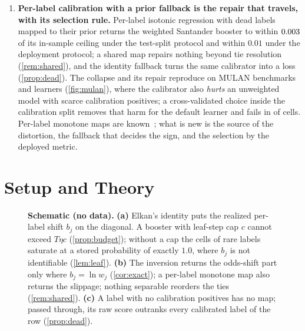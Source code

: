 \documentclass[sigconf,nonacm]{acmart}
\begin{document}
\begin{enumerate}[leftmargin=*,nosep]
\item \textbf{Per-label calibration with a prior fallback is the repair that travels, with its selection rule.} Per-label isotonic regression with dead labels mapped to their prior returns the weighted Santander booster to within $0.003$ of its in-sample ceiling under the test-split protocol and within $0.01$ under the deployment protocol; a shared map repairs nothing beyond tie resolution (\cref{rem:shared}), and the identity fallback turns the same calibrator into a loss (\cref{prop:dead}). The collapse and its repair reproduce on \nnMulan{} MULAN benchmarks and \nnLearners{} learners (\cref{fig:mulan}), where the calibrator also \emph{hurts} an unweighted model with scarce calibration positives; a cross-validated choice inside the calibration split removes that harm for the default learner and fails in \nnTauSelBelowRaw{} of \nnTauCells{} cells. Per-label monotone maps are known~\cite{Zadrozny2002,Tae2026MRP}; what is new is the source of the distortion, the fallback that decides the sign, and the selection by the deployed metric.
\end{enumerate}

\section{Setup and Theory}
\label{sec:theory}

\begin{figure}[t]
\centering
{}
\caption{\textbf{Schematic (no data).} \textbf{(a)} Elkan's identity puts the realized per-label shift $b_j$ on the diagonal. A booster with leaf-step cap $c$ cannot exceed $T\eta c$ (\cref{prop:budget}); without a cap the cells of rare labels saturate at a stored probability of exactly $1.0$, where $b_j$ is not identifiable (\cref{lem:leaf}). \textbf{(b)} The inversion returns the odds-shift part only where $b_j=\ln w_j$ (\cref{cor:exact}); a per-label monotone map also returns the slippage; nothing separable reorders the ties (\cref{rem:shared}). \textbf{(c)} A label with no calibration positives has no map; passed through, its raw score outranks every calibrated label of the row (\cref{prop:dead}).}
\label{fig:schematic}
\end{figure}
\end{document}
